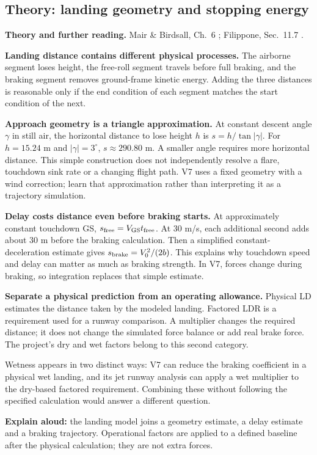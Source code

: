 \documentclass[11pt,letterpaper]{article}
\newcommand{\theorypage}[1]{\clearpage\subsection*{\color{navy}\thesection\enspace Theory: #1}}
\newcommand{\reading}[1]{{\small\color{navy}\textbf{Theory and further reading.} #1\par}\vspace{3pt}}
\begin{document}
\theorypage{landing geometry and stopping energy}
\reading{Mair \& Birdsall, Ch.~6 \cite{mair}; Filippone, Sec.~11.7 \cite{filippone}.}
\textbf{Landing distance contains different physical processes.}
The airborne segment loses height, the free-roll segment travels before full
braking, and the braking segment removes ground-frame kinetic energy.
Adding the three distances is reasonable only if the end condition of each
segment matches the start condition of the next.

\textbf{Approach geometry is a triangle approximation.}
At constant descent angle $\gamma$ in still air, the horizontal distance to lose
height $h$ is $s=h/\tan|\gamma|$. For $h=15.24$ m and $|\gamma|=3^\circ$,
$s\approx290.80$ m. A smaller angle requires more horizontal distance.
This simple construction does not independently resolve a flare, touchdown
sink rate or a changing flight path. V7 uses a fixed geometry with a wind
correction; learn that approximation rather than interpreting it as a trajectory
simulation.

\textbf{Delay costs distance even before braking starts.}
At approximately constant touchdown GS, $s_{\rm free}=V_{\rm GS}t_{\rm free}$.
At 30 m/s, each additional second adds about 30 m before the braking calculation.
Then a simplified constant-deceleration estimate gives $s_{\rm brake}=V_0^2/(2b)$.
This explains why touchdown speed and delay can matter as much as braking strength.
In V7, forces change during braking, so integration replaces that simple estimate.

\textbf{Separate a physical prediction from an operating allowance.}
Physical LD estimates the distance taken by the modeled landing. Factored LDR
is a requirement used for a runway comparison. A multiplier changes the required
distance; it does not change the simulated force balance or add real brake force.
The project's dry and wet factors belong to this second category.

Wetness appears in two distinct ways: V7 can reduce the braking coefficient in
a physical wet landing, and its jet runway analysis can apply a wet multiplier
to the dry-based factored requirement. Combining these without following the
specified calculation would answer a different question.

\begin{keyidea}
\textbf{Explain aloud:} the landing model joins a geometry estimate, a delay
estimate and a braking trajectory. Operational factors are applied to a defined
baseline after the physical calculation; they are not extra forces.
\end{keyidea}
\end{document}
